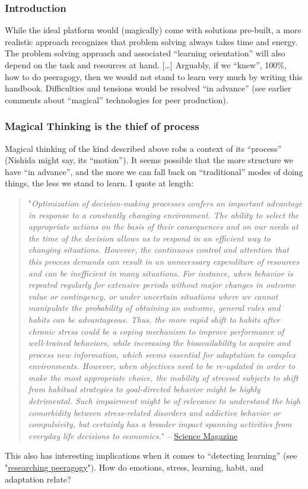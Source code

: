 \subsubsection{Introduction}

While the ideal platform would (magically) come with solutions
pre-built, a more realistic approach recognizes that problem solving
always takes time and energy. The problem solving approach and
associated ``learning orientation'' will also depend on the task and
resources at hand. {[}\ldots{}{]} Arguably, if we ``knew'', 100\%, how
to do peeragogy, then we would not stand to learn very much by writing
this handbook. Difficulties and tensions would be resolved ``in
advance'' (see earlier comments about ``magical'' technologies for peer
production).

\subsubsection{Magical Thinking is the thief of process}

Magical thinking of the kind described above robs a context of its
``process'' (Nishida might say, its ``motion''). It seems possible that
the more structure we have ``in advance'', and the more we can fall back
on ``traditional'' modes of doing things, the less we stand to learn. I
quote at length:

\begin{quote}
"\emph{Optimization of decision-making processes confers an important
advantage in response to a constantly changing environment. The ability
to select the appropriate actions on the basis of their consequences and
on our needs at the time of the decision allows us to respond in an
efficient way to changing situations. However, the continuous control
and attention that this process demands can result in an unnecessary
expenditure of resources and can be inefficient in many situations. For
instance, when behavior is repeated regularly for extensive periods
without major changes in outcome value or contingency, or under
uncertain situations where we cannot manipulate the probability of
obtaining an outcome, general rules and habits can be advantageous.
Thus, the more rapid shift to habits after chronic stress could be a
coping mechanism to improve performance of well-trained behaviors, while
increasing the bioavailability to acquire and process new information,
which seems essential for adaptation to complex environments. However,
when objectives need to be re-updated in order to make the most
appropriate choice, the inability of stressed subjects to shift from
habitual strategies to goal-directed behavior might be highly
detrimental. Such impairment might be of relevance to understand the
high comorbidity between stress-related disorders and addictive behavior
or compulsivity, but certainly has a broader impact spanning activities
from everyday life decisions to economics.}" --
\href{http://www.sciencemag.org/content/325/5940/621.full}{Science
Magazine}
\end{quote}
This also has interesting implications when it comes to ``detecting
learning'' (see
"\href{http://peeragogy.org/to-peeragogy/researching-peeragogy/}{researching
peeragogy}"). How do emotions, stress, learning, habit, and adaptation
relate?
